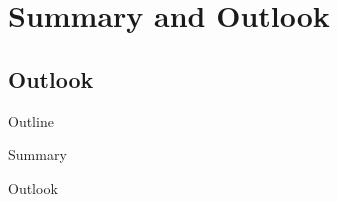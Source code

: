\section[Summary]{Summary and Outlook}
\subsection*{Outlook}
\begin{frame}{Outline}
	\tableofcontents[currentsection]
\end{frame}


\begin{frame}{Summary}
	\missing
\end{frame}


\begin{frame}{Outlook}
	\missing
\end{frame}

